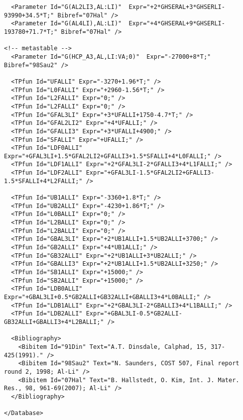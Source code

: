 \documentclass{article}
\begin{document}
\begin{appendices}
\begin{verbatim}
  <Parameter Id="G(AL2LI3,AL:LI)"  Expr="+2*GHSERAL+3*GHSERLI-93990+34.5*T;" Bibref="07Hal" />
  <Parameter Id="G(AL4LI),AL:LI)"  Expr="+4*GHSERAL+9*GHSERLI-193780+71.7*T;" Bibref="07Hal" />

<!-- metastable -->
  <Parameter Id="G(HCP_A3,AL,LI:VA;0)"  Expr="-27000+8*T;" Bibref="98Sau2" />

  <TPfun Id="UFALLI" Expr="-3270+1.96*T;" />
  <TPfun Id="L0FALLI" Expr="+2960-1.56*T;" />
  <TPfun Id="L2FALLI" Expr="0;" />
  <TPfun Id="L2FALLI" Expr="0;" />
  <TPfun Id="GFAL3LI" Expr="+3*UFALLI+1750-4.7*T;" />
  <TPfun Id="GFAL2LI2" Expr="+4*UFALLI;" />
  <TPfun Id="GFALLI3" Expr="+3*UFALLI+4900;" />
  <TPfun Id="SFALLI" Expr="+UFALLI;" />
  <TPfun Id="LDF0ALLI" Expr="+GFAL3LI+1.5*GFAL2LI2+GFALLI3+1.5*SFALLI+4*L0FALLI;" />
  <TPfun Id="LDF1ALLI" Expr="+2*GFAL3LI-2*GFALLI3+4*L1FALLI;" />
  <TPfun Id="LDF2ALLI" Expr="+GFAL3LI-1.5*GFAL2LI2+GFALLI3-1.5*SFALLI+4*L2FALLI;" />

  <TPfun Id="UB1ALLI" Expr="-3360+1.8*T;" />
  <TPfun Id="UB2ALLI" Expr="-4230+1.86*T;" />
  <TPfun Id="L0BALLI" Expr="0;" />
  <TPfun Id="L2BALLI" Expr="0;" />
  <TPfun Id="L2BALLI" Expr="0;" />
  <TPfun Id="GBAL3LI" Expr="+2*UB1ALLI+1.5*UB2ALLI+3700;" />
  <TPfun Id="GB2ALLI" Expr="+4*UB1ALLI;" />
  <TPfun Id="GB32ALLI" Expr="+2*UB1ALLI+3*UB2ALLI;" />
  <TPfun Id="GBALLI3" Expr="+2*UB1ALLI+1.5*UB2ALLI+3250;" />
  <TPfun Id="SB1ALLI" Expr="+15000;" />
  <TPfun Id="SB2ALLI" Expr="+15000;" />
  <TPfun Id="LDB0ALLI" Expr="+GBAL3LI+0.5*GB2ALLI+GB32ALLI+GBALLI3+4*L0BALLI;" />
  <TPfun Id="LDB1ALLI" Expr="+2*GBAL3LI-2*GBALLI3+4*L1BALLI;" />
  <TPfun Id="LDB2ALLI" Expr="+GBAL3LI-0.5*GB2ALLI-GB32ALLI+GBALLI3+4*L2BALLI;" />

  <Bibliography>
    <Bibitem Id="91Din" Text="A.T. Dinsdale, Calphad, 15, 317-425(1991)." />
    <Bibitem Id="98Sau2" Text="N. Saunders, COST 507, Final report round 2, 1998; Al-Li" />
    <Bibitem Id="07Hal" Text="B. Hallstedt, O. Kim, Int. J. Mater. Res., 98, 961-69(2007); Al-Li" />
  </Bibliography> 

</Database>
\end{verbatim}

\end{appendices}
\end{document}
